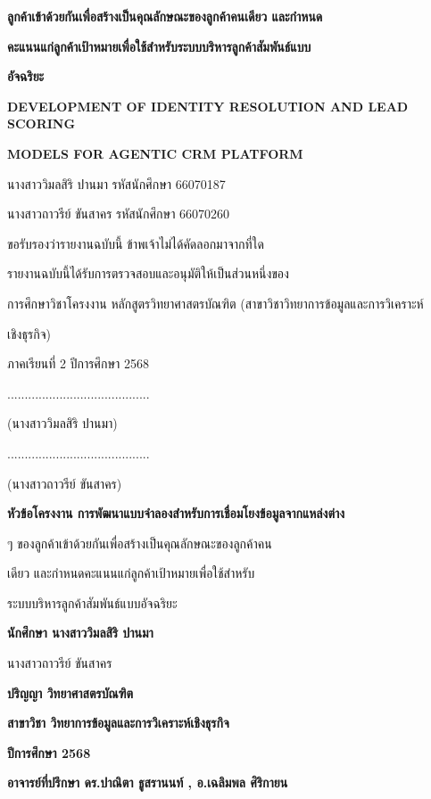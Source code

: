 \documentclass[12pt,a4paper]{report}
\begin{document}
\begin{center}\bfseries ลูกค้าเข้าด้วยกันเพื่อสร้างเป็นคุณลักษณะของลูกค้าคนเดียว และกำหนด\end{center}
\begin{center}\bfseries คะแนนแก่ลูกค้าเป้าหมายเพื่อใช้สำหรับระบบบริหารลูกค้าสัมพันธ์แบบ\end{center}
\begin{center}\bfseries อัจฉริยะ\end{center}
\begin{center}\bfseries DEVELOPMENT OF IDENTITY RESOLUTION AND LEAD SCORING\end{center}
\begin{center}\bfseries MODELS FOR AGENTIC CRM PLATFORM\end{center}
นางสาววิมลสิริ ปานมา รหัสนักศึกษา 66070187\par
นางสาวถาวรีย์ ขันสาคร รหัสนักศึกษา 66070260\par
ขอรับรองว่ารายงานฉบับนี้ ข้าพเจ้าไม่ได้คัดลอกมาจากที่ใด\par
รายงานฉบับนี้ได้รับการตรวจสอบและอนุมัติให้เป็นส่วนหนึ่งของ\par
การศึกษาวิชาโครงงาน หลักสูตรวิทยาศาสตรบัณฑิต (สาขาวิชาวิทยาการข้อมูลและการวิเคราะห์\par
เชิงธุรกิจ)\par
ภาคเรียนที่ 2 ปีการศึกษา 2568\par
.........................................\par
(นางสาววิมลสิริ ปานมา)\par
.........................................\par
(นางสาวถาวรีย์ ขันสาคร)\par
\clearpage
\begin{center}\bfseries หัวข้อโครงงาน การพัฒนาแบบจำลองสำหรับการเชื่อมโยงข้อมูลจากแหล่งต่าง\end{center}
ๆ ของลูกค้าเข้าด้วยกันเพื่อสร้างเป็นคุณลักษณะของลูกค้าคน\par
เดียว และกำหนดคะแนนแก่ลูกค้าเป้าหมายเพื่อใช้สำหรับ\par
ระบบบริหารลูกค้าสัมพันธ์แบบอัจฉริยะ\par
\begin{center}\bfseries นักศึกษา นางสาววิมลสิริ ปานมา\end{center}
นางสาวถาวรีย์ ขันสาคร\par
\begin{center}\bfseries ปริญญา วิทยาศาสตรบัณฑิต\end{center}
\begin{center}\bfseries สาขาวิชา วิทยาการข้อมูลและการวิเคราะห์เชิงธุรกิจ\end{center}
\begin{center}\bfseries ปีการศึกษา 2568\end{center}
\begin{center}\bfseries อาจารย์ที่ปรึกษา ดร.ปาณิตา ธูสรานนท์ , อ.เฉลิมพล ศิริกายน\end{center}
\end{document}
